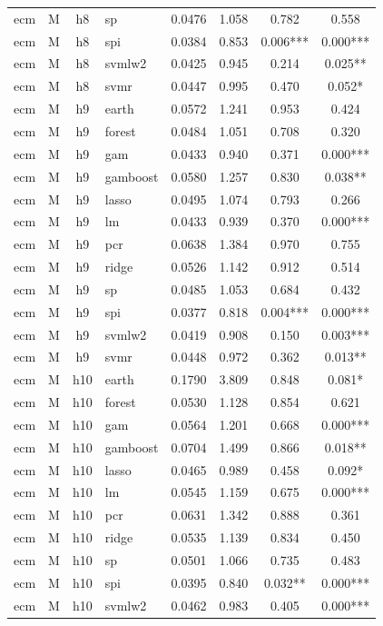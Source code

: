 \begin{ThreePartTable}
\begin{longtable}[t]{llclcccc}
ecm & M & h8 & sp & 0.0476 & 1.058 & 0.782 & 0.558\\
ecm & M & h8 & spi & 0.0384 & 0.853 & 0.006*** & 0.000***\\
ecm & M & h8 & svmlw2 & 0.0425 & 0.945 & 0.214 & 0.025**\\
ecm & M & h8 & svmr & 0.0447 & 0.995 & 0.470 & 0.052*\\
\addlinespace
ecm & M & h9 & earth & 0.0572 & 1.241 & 0.953 & 0.424\\
ecm & M & h9 & forest & 0.0484 & 1.051 & 0.708 & 0.320\\
ecm & M & h9 & gam & 0.0433 & 0.940 & 0.371 & 0.000***\\
ecm & M & h9 & gamboost & 0.0580 & 1.257 & 0.830 & 0.038**\\
ecm & M & h9 & lasso & 0.0495 & 1.074 & 0.793 & 0.266\\
ecm & M & h9 & lm & 0.0433 & 0.939 & 0.370 & 0.000***\\
ecm & M & h9 & pcr & 0.0638 & 1.384 & 0.970 & 0.755\\
ecm & M & h9 & ridge & 0.0526 & 1.142 & 0.912 & 0.514\\
ecm & M & h9 & sp & 0.0485 & 1.053 & 0.684 & 0.432\\
ecm & M & h9 & spi & 0.0377 & 0.818 & 0.004*** & 0.000***\\
ecm & M & h9 & svmlw2 & 0.0419 & 0.908 & 0.150 & 0.003***\\
ecm & M & h9 & svmr & 0.0448 & 0.972 & 0.362 & 0.013**\\
\addlinespace
ecm & M & h10 & earth & 0.1790 & 3.809 & 0.848 & 0.081*\\
ecm & M & h10 & forest & 0.0530 & 1.128 & 0.854 & 0.621\\
ecm & M & h10 & gam & 0.0564 & 1.201 & 0.668 & 0.000***\\
ecm & M & h10 & gamboost & 0.0704 & 1.499 & 0.866 & 0.018**\\
ecm & M & h10 & lasso & 0.0465 & 0.989 & 0.458 & 0.092*\\
ecm & M & h10 & lm & 0.0545 & 1.159 & 0.675 & 0.000***\\
ecm & M & h10 & pcr & 0.0631 & 1.342 & 0.888 & 0.361\\
ecm & M & h10 & ridge & 0.0535 & 1.139 & 0.834 & 0.450\\
ecm & M & h10 & sp & 0.0501 & 1.066 & 0.735 & 0.483\\
ecm & M & h10 & spi & 0.0395 & 0.840 & 0.032** & 0.000***\\
ecm & M & h10 & svmlw2 & 0.0462 & 0.983 & 0.405 & 0.000***\\

\end{longtable}
\end{ThreePartTable}
